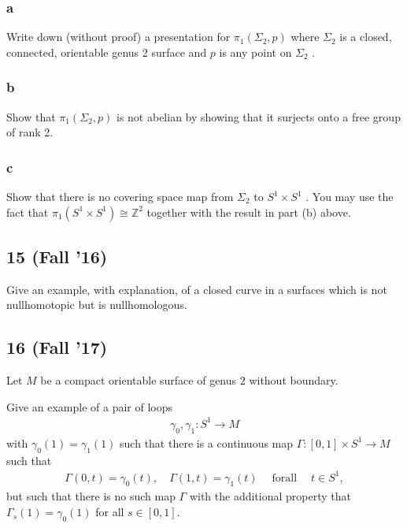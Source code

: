 \hypertarget{a-4}{%
\subsubsection{a}\label{a-4}}

Write down (without proof) a presentation for \(\pi_1 (\Sigma_2 , p)\)
where \(\Sigma_2\) is a closed, connected, orientable genus 2 surface
and \(p\) is any point on \(\Sigma_2\) .

\hypertarget{b-4}{%
\subsubsection{b}\label{b-4}}

Show that \(\pi_1 (\Sigma_2 , p)\) is not abelian by showing that it
surjects onto a free group of rank 2.

\hypertarget{c-1}{%
\subsubsection{c}\label{c-1}}

Show that there is no covering space map from \(\Sigma_2\) to
\(S^1 \times S^1\) . You may use the fact that
\(\pi_1 (S^1 \times S^1 ) \cong {\mathbb{Z}}^2\) together with the
result in part (b) above.

\hypertarget{fall-16-6}{%
\subsection{15 (Fall '16)}\label{fall-16-6}}

Give an example, with explanation, of a closed curve in a surfaces which
is not nullhomotopic but is nullhomologous.

\hypertarget{fall-17-5}{%
\subsection{16 (Fall '17)}\label{fall-17-5}}

Let \(M\) be a compact orientable surface of genus \(2\) without
boundary.

Give an example of a pair of loops
\begin{align*}\gamma_0 , \gamma_1 : S^1 \to M\end{align*}
with \(\gamma_0 (1) = \gamma_1 (1)\) such that there is a continuous map
\(\Gamma: [0, 1] \times S^1 \to M\) such that
\begin{align*}
\Gamma(0, t) = \gamma_0 (t), \quad \Gamma(1, t) = \gamma_1 (t) {\quad \operatorname{for all} \quad} t \in S^1
,\end{align*}
but such that there is no such map \(\Gamma\) with the additional
property that \(\Gamma_s (1) = \gamma_0 (1)\) for all \(s \in [0, 1]\).

